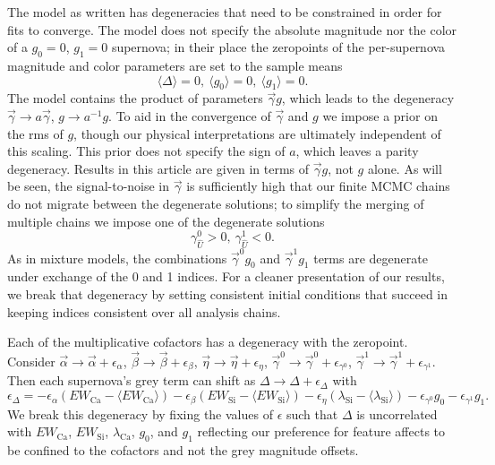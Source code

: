 \documentclass[trackchanges]{aastex62}   	%
\begin{document}
The model as written has degeneracies that need to be constrained in order for fits to converge.
The model does not specify the absolute magnitude nor the 
color of a $g_0=0$, $g_1=0$ supernova;
in their place the zeropoints of the per-supernova magnitude and color parameters are set to the sample means
\begin{equation}
\langle \Delta \rangle=0,\ \langle g_0 \rangle=0,\ \langle g_1 \rangle=0.
\label{zero:eqn}
\end{equation}
The model contains the product of parameters
$\vec{\gamma} g$, which leads to the degeneracy $\vec{\gamma} \rightarrow a\vec{\gamma}$, $g \rightarrow a^{-1} g$.
To aid in the convergence of $\vec{\gamma}$ and $g$ we impose a prior on the rms of $g$, though
our physical interpretations are ultimately independent of this scaling.
This prior does not specify the sign of $a$, which leaves a parity degeneracy. 
Results in this article are given in terms of $\vec{\gamma}g$, not $g$ alone.
As will be seen, the signal-to-noise in $\vec{\gamma}$ is sufficiently
high that our finite MCMC chains do not migrate between the degenerate solutions; to simplify the merging of multiple chains
we impose one of the degenerate solutions
\begin{equation}
\gamma^0_{\hat{U}} > 0,\ \gamma^1_{\hat{U}} < 0.
\end{equation}
As  in mixture models, the combinations $\vec{\gamma}^0 g_0$ and $\vec{\gamma}^1 g_1$ terms are degenerate under exchange of the 0 and 1 indices. For a cleaner presentation of our results, 
we break that degeneracy  by setting consistent initial conditions that succeed in keeping indices consistent over all analysis chains.  

Each of the multiplicative cofactors has a degeneracy with the zeropoint.  Consider
$\vec{\alpha} \rightarrow \vec{\alpha} +   \epsilon_{\alpha}$,
$\vec{\beta} \rightarrow \vec{\beta} +   \epsilon_{\beta}$,
$\vec{\eta} \rightarrow \vec{\eta} +   \epsilon_{\eta}$,
$\vec{\gamma}^0 \rightarrow \vec{\gamma}^0 +   \epsilon_{\gamma^0}$,
$\vec{\gamma}^1 \rightarrow \vec{\gamma}^1 +   \epsilon_{\gamma^1}$.
Then
each supernova's grey term can shift as
$\Delta \rightarrow \Delta  + \epsilon_\Delta$
with
$$
\epsilon_\Delta  = -  \epsilon_{\alpha} (EW_{\text{Ca}}-\langle EW_{\text{Ca}}\rangle)- 
 \epsilon_{\beta} (EW_{\mathrm{Si}}-\langle EW_{\mathrm{Si}}\rangle) -  \epsilon_{\eta} (\lambda_{\mathrm{Si}}-\langle \lambda_{\mathrm{Si}}\rangle)
- \epsilon_{\gamma^0}g_0 -  \epsilon_{\gamma^1}g_1.
$$
We break this degeneracy by fixing the values of $\epsilon$ such that $\Delta$ is
uncorrelated with  $EW_{\text{Ca}}$, $EW_{\mathrm{Si}}$, $\lambda_{\text{Ca}}$,
$g_0$, and $g_1$ reflecting
our preference for feature affects to be confined to the cofactors and not the grey magnitude offsets.
\end{document}
